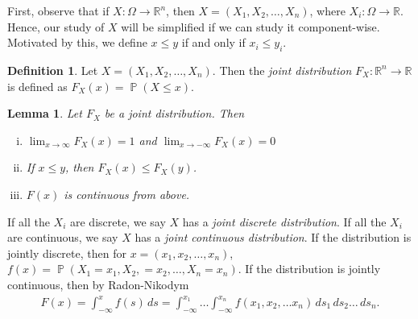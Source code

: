 \documentclass[12pt]{amsbook}
\newcommand{\rr}{\mathbb{R}}
\DeclareMathOperator{\prob}{\mathbb{P}}
\theoremstyle{plain}
\newtheorem{lemma}[theorem]{Lemma}
\theoremstyle{definition}
\newtheorem*{definition}{Definition}
\theoremstyle{remark}
\numberwithin{equation}{section}  %
\numberwithin{equation}{section}  %
\begin{document}
First, observe that if ${X}: \Omega \to \rr^n$, then $X = (X_1, X_2,
\ldots, X_n)$, where $X_i: \Omega \to \rr$. Hence, our study of $X$ will be
simplified if we can study it component-wise. Motivated by this, we define
$x \le y$ if and only if $x_i \le y_i$. 
\begin{definition}
	Let ${X} = (X_1, X_2, \ldots, X_n)$. Then the \emph{joint distribution}
	$F_X: \rr^n \to \rr$
	is defined as $F_X(x) = \prob({X} \le x)$.
	\begin{lemma}
		Let $F_X$ be a joint distribution. Then
		\begin{enumerate}[(i)]
			\item
				$\lim_{x \to \infty} F_X(x) = 1$ and $\lim_{x \to -\infty}
				F_X(x) = 0$
			\item
				If $x \le y$, then $F_X(x) \le F_X(y)$.
			\item
				$F(x)$ is continuous from above.
		\end{enumerate}
	\end{lemma}
	If all the $X_i$ are discrete, we say $X$ has a \emph{joint discrete
	distribution}. If all the $X_i$ are continuous, we say $X$ has a 
	\emph{joint continuous distribution}. If the distribution is jointly 
	discrete,
	then for $x = (x_1, x_2, \ldots, x_n)$,
	$f(x) = \prob(X_1 = x_1, X_2, = x_2,
	\ldots, X_n = x_n)$. If the distribution is jointly continuous, then by
	Radon-Nikodym
	\begin{align*}
		F(x) = \int_{-\infty}^x f(s) \, ds = \int_{-\infty}^{x_1} \ldots
		\int_{-\infty}^{x_n} f(x_1, x_2, \ldots x_n) \, ds_1 \, ds_2 \ldots \, 
		ds_n.
	\end{align*}


\end{definition}
\end{document}
